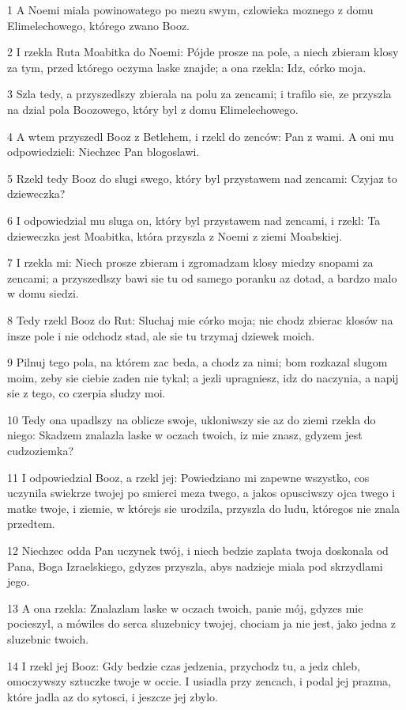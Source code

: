 \par 1 A Noemi miala powinowatego po mezu swym, czlowieka moznego z domu Elimelechowego, którego zwano Booz.
\par 2 I rzekla Ruta Moabitka do Noemi: Pójde prosze na pole, a niech zbieram klosy za tym, przed którego oczyma laske znajde; a ona rzekla: Idz, córko moja.
\par 3 Szla tedy, a przyszedlszy zbierala na polu za zencami; i trafilo sie, ze przyszla na dzial pola Boozowego, który byl z domu Elimelechowego.
\par 4 A wtem przyszedl Booz z Betlehem, i rzekl do zenców: Pan z wami. A oni mu odpowiedzieli: Niechzec Pan blogoslawi.
\par 5 Rzekl tedy Booz do slugi swego, który byl przystawem nad zencami: Czyjaz to dzieweczka?
\par 6 I odpowiedzial mu sluga on, który byl przystawem nad zencami, i rzekl: Ta dzieweczka jest Moabitka, która przyszla z Noemi z ziemi Moabskiej.
\par 7 I rzekla mi: Niech prosze zbieram i zgromadzam klosy miedzy snopami za zencami; a przyszedlszy bawi sie tu od samego poranku az dotad, a bardzo malo w domu siedzi.
\par 8 Tedy rzekl Booz do Rut: Sluchaj mie córko moja; nie chodz zbierac klosów na insze pole i nie odchodz stad, ale sie tu trzymaj dziewek moich.
\par 9 Pilnuj tego pola, na którem zac beda, a chodz za nimi; bom rozkazal slugom moim, zeby sie ciebie zaden nie tykal; a jezli upragniesz, idz do naczynia, a napij sie z tego, co czerpia sludzy moi.
\par 10 Tedy ona upadlszy na oblicze swoje, ukloniwszy sie az do ziemi rzekla do niego: Skadzem znalazla laske w oczach twoich, iz mie znasz, gdyzem jest cudzoziemka?
\par 11 I odpowiedzial Booz, a rzekl jej: Powiedziano mi zapewne wszystko, cos uczynila swiekrze twojej po smierci meza twego, a jakos opusciwszy ojca twego i matke twoje, i ziemie, w którejs sie urodzila, przyszla do ludu, któregos nie znala przedtem.
\par 12 Niechzec odda Pan uczynek twój, i niech bedzie zaplata twoja doskonala od Pana, Boga Izraelskiego, gdyzes przyszla, abys nadzieje miala pod skrzydlami jego.
\par 13 A ona rzekla: Znalazlam laske w oczach twoich, panie mój, gdyzes mie pocieszyl, a mówiles do serca sluzebnicy twojej, chociam ja nie jest, jako jedna z sluzebnic twoich.
\par 14 I rzekl jej Booz: Gdy bedzie czas jedzenia, przychodz tu, a jedz chleb, omoczywszy sztuczke twoje w occie. I usiadla przy zencach, i podal jej prazma, które jadla az do sytosci, i jeszcze jej zbylo.
